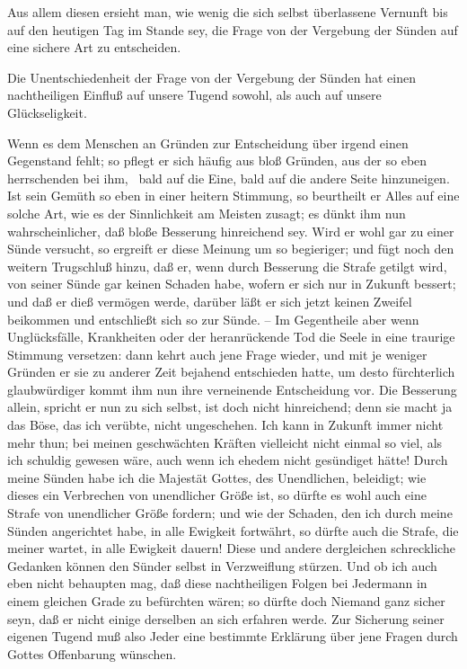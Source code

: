 \begin{aufza}\setcounter{enumi}{3}
\item Aus allem diesen ersieht man, wie wenig die sich selbst überlassene Vernunft bis auf den heutigen Tag im Stande sey, die Frage von der Vergebung der Sünden auf eine sichere Art zu entscheiden.
\end{aufza}

Die Unentschiedenheit der Frage von der Vergebung der Sünden hat einen nachtheiligen Einfluß auf unsere Tugend sowohl, als auch auf unsere Glückseligkeit.
\begin{aufza}
\item Wenn es dem Menschen an  Gründen zur Entscheidung über irgend einen Gegenstand fehlt; so pflegt er sich häufig aus bloß  Gründen, aus der so eben herrschenden  bei ihm, \udgl\  bald auf die Eine, bald auf die andere Seite hinzuneigen. Ist sein Gemüth so eben in einer heitern Stimmung, so beurtheilt er Alles auf eine solche Art, wie es der Sinnlichkeit am Meisten zusagt; es dünkt ihm nun wahrscheinlicher, daß bloße Besserung hinreichend sey. Wird er wohl gar zu einer Sünde versucht, so ergreift er diese Meinung um so begieriger; und fügt noch den weitern Trugschluß hinzu, daß er, wenn durch Besserung die Strafe getilgt wird, von seiner Sünde gar keinen Schaden habe, wofern er sich nur in Zukunft bessert; und daß er dieß vermögen werde, darüber läßt er sich jetzt keinen Zweifel beikommen und entschließt sich so zur Sünde. -- Im Gegentheile aber wenn Unglücksfälle, Krankheiten oder der heranrückende Tod die Seele in eine traurige Stimmung versetzen: dann kehrt auch jene Frage wieder, und mit je weniger Gründen er sie zu anderer Zeit bejahend entschieden hatte, um desto fürchterlich glaubwürdiger kommt ihm nun ihre verneinende Entscheidung vor. Die Besserung allein, spricht er nun zu sich selbst, ist doch nicht hinreichend; denn sie macht ja das Böse, das ich verübte, nicht ungeschehen. Ich kann in Zukunft immer nicht mehr thun; bei meinen geschwächten Kräften vielleicht nicht einmal so viel, als ich schuldig gewesen wäre, auch wenn ich ehedem nicht gesündiget hätte! Durch meine Sünden habe ich die Majestät Gottes, des Unendlichen, beleidigt; wie dieses ein Verbrechen von unendlicher Größe ist, so dürfte es wohl auch eine Strafe von unendlicher Größe fordern; und wie der Schaden, den ich durch meine Sünden angerichtet habe, in alle Ewigkeit fortwährt, so dürfte auch die Strafe, die meiner wartet, in alle Ewigkeit dauern! Diese und andere dergleichen schreckliche Gedanken können den Sünder selbst in Verzweiflung stürzen. Und ob ich auch eben nicht behaupten mag, daß diese nachtheiligen Folgen bei Jedermann in einem gleichen Grade zu befürchten wären; so dürfte doch Niemand ganz sicher seyn, daß er nicht einige derselben an sich erfahren werde. Zur Sicherung seiner eigenen Tugend muß also Jeder eine bestimmte Erklärung über jene Fragen durch Gottes Offenbarung wünschen.

\end{aufza}
